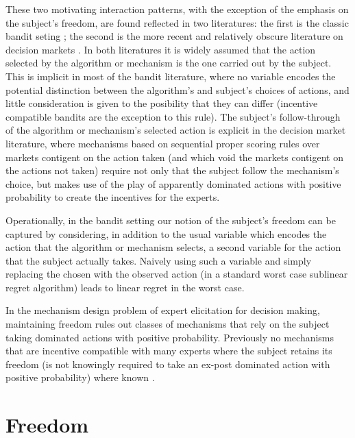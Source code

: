 These two motivating interaction patterns, with the exception of the emphasis on the subject's freedom, are found reflected in two literatures: the first is the classic bandit seting \cite{thompson:33,bubeck:12}; the second is the more recent and relatively obscure literature on decision markets \cite{berg2003prediction,hanson2002decision,othman2010decision,boutilier2012eliciting,chen2014eliciting}. In both literatures it is widely assumed that the action selected by the algorithm or mechanism is the one carried out by the subject. This is implicit in most of the bandit literature, where no variable encodes the potential distinction between the algorithm's and subject's choices of actions, and little consideration is given to the posibility that they can differ (incentive compatible bandits are the exception to this rule). The subject's follow-through of the algorithm or mechanism's selected action is explicit in the decision market literature, where mechanisms based on sequential proper scoring rules over markets contigent on the action taken (and which void the markets contigent on the actions not taken) require not only that the subject follow the mechanism's choice, but makes use of the play of apparently dominated actions with positive probability to create the incentives for the experts.

Operationally, in the bandit setting our notion of the subject's freedom can be captured by considering, in addition to the usual variable which encodes the action that the algorithm  or mechanism selects, a second variable for the action that the subject actually takes. Naively using such a variable and simply replacing the chosen with the observed action (in a standard worst case sublinear regret algorithm) leads to linear regret in the worst case.

In the mechanism design problem of expert elicitation for decision making, maintaining freedom rules out classes of mechanisms that rely on the subject taking dominated actions with positive probability. Previously no mechanisms that are incentive compatible with many experts where the subject retains its freedom (is not knowingly required to take an ex-post dominated action with positive probability) where known \cite{othman2010decision,chen2014eliciting}.



\section{Freedom}

